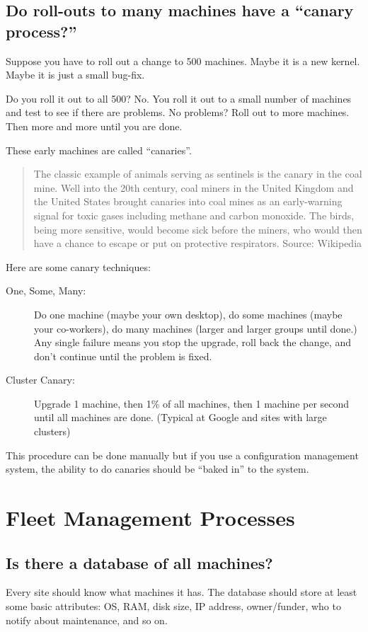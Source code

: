 \documentclass{article}
\begin{document}
\subsection{Do roll-outs to many machines have a ``canary process?''}
Suppose you have to roll out a change to 500 machines. Maybe it is a new kernel. Maybe it is just a small bug-fix.

Do you roll it out to all 500? No. You roll it out to a small number of machines and test to see if there are problems. No problems? Roll out to more machines. Then more and more until you are done.

These early machines are called ``canaries''.

\begin{quote}
	The classic example of animals serving as sentinels is the canary in the coal mine. Well into the 20th century, coal miners in the United Kingdom and the United States brought canaries into coal mines as an early-warning signal for toxic gases including methane and carbon monoxide. The birds, being more sensitive, would become sick before the miners, who would then have a chance to escape or put on protective respirators. Source: Wikipedia
\end{quote}

Here are some canary techniques:

\begin{description}
	\item[One, Some, Many:] Do one machine (maybe your own desktop), do some machines (maybe your co-workers), do many machines (larger and larger groups until done.) Any single failure means you stop the upgrade, roll back the change, and don't continue until the problem is fixed.
	\item [Cluster Canary:] Upgrade 1 machine, then 1\% of all machines, then 1 machine per second until all machines are done. (Typical at Google and sites with large clusters)
\end{description}

This procedure can be done manually but if you use a configuration management system, the ability to do canaries should be ``baked in'' to the system.

\section{Fleet Management Processes}
\subsection{Is there a database of all machines? \Checkmark}
Every site should know what machines it has. The database should store at least some basic attributes: OS, RAM, disk size, IP address, owner/funder, who to notify about maintenance, and so on.
\end{document}
